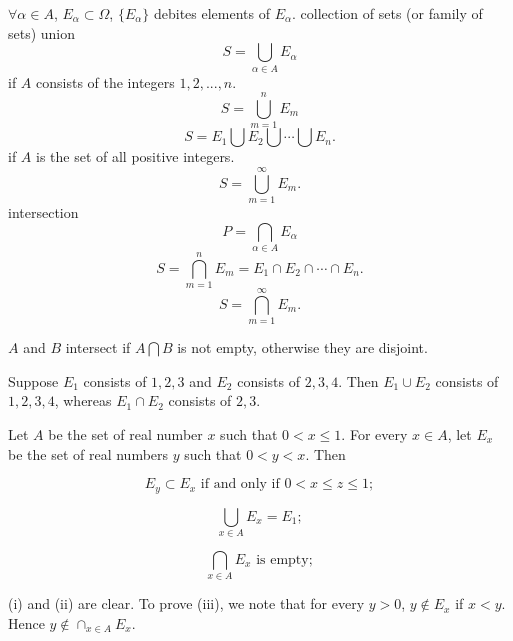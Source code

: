 \begin{mydef}
    \label{mydef:2.9}
    $\forall \alpha\in A$, $E_\alpha \subset \Omega$, $\{E_\alpha\}$ debites elements of $E_\alpha$. 
    collection of sets (or family of sets)  
    union
    \begin{equation}
        \label{eq:2.1}
        S = \bigcup_{\alpha\in A} E_\alpha
    \end{equation}
    if $A$ consists of the integers $1,2,...,n$.
    \begin{equation}
        \label{eq:2.2}
        S = \bigcup_{m=1}^n E_m
    \end{equation}
    \begin{equation}
        \label{eq:2.3}
        S = E_1 \bigcup E_2 \bigcup \cdots \bigcup E_n.
    \end{equation}
    if $A$ is the set of all positive integers.
    \begin{equation}
        \label{eq:2.4}
        S = \bigcup_{m=1}^{\infty} E_m.
    \end{equation}
    intersection
    \begin{equation}
        \label{eq:2.5}
        P = \bigcap_{\alpha\in A} E_\alpha
    \end{equation}
    \begin{equation}
        \label{eq:2.6}
        S = \bigcap_{m=1}^n E_m = E_1 \cap E_2 \cap \cdots \cap E_n.
    \end{equation}
    \begin{equation}
        \label{eq:2.7}
        S = \bigcap_{m=1}^{\infty} E_m.
    \end{equation}

    $A$ and $B$ intersect if $A\bigcap B$ is not empty, otherwise they are disjoint.
\end{mydef}

\begin{newexample}
    \begin{asparaenum}[(a)]
        \item Suppose $E_1$ consists of $1,2,3$ and 
        $E_2$ consists of $2,3,4$.
        Then $E_1 \cup E_2$ consists of $1,2,3,4$,
        whereas $E_1 \cap E_2$ consists of $2,3$.
        \item Let $A$ be the set of real number $x$ such that $0< x\leq 1$. 
        For every $x \in A$, let $E_x$ be the set of real numbers $y$ such that $0 < y < x$. Then 
        \begin{asparaenum}[(i)]
            \item \[E_y \subset E_x \text{ if and only if } 0 < x \leq z \leq 1;\] 
            \item \[\bigcup_{x\in A}E_x = E_1;\]
            \item \[\bigcap_{x\in A}E_x \text{ is empty};\]
        \end{asparaenum}
        (i) and (ii) are clear.
        To prove (iii), we note that for every $y>0$, $y \not\in E_x$ if $x < y$. 
        Hence $y \not\in \cap_{x\in A}E_x$.
    \end{asparaenum}
\end{newexample}

